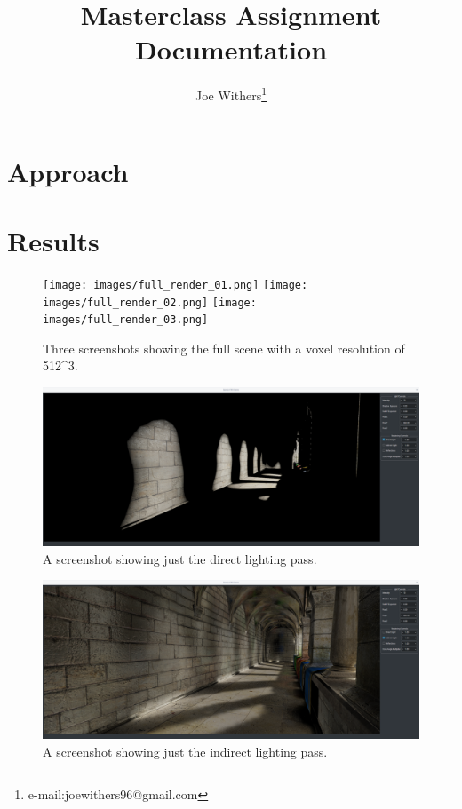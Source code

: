 \documentclass[]{acmsiggraph}
\title{Masterclass Assignment Documentation}
\author{Joe Withers\thanks{e-mail:joewithers96@gmail.com}}
\begin{document}

\maketitle

\section{Approach}

\section{Results}

\begin{figure}[htbp]\centering
 \texttt{[image: images/full\_render\_01.png]}
 \texttt{[image: images/full\_render\_02.png]}
 \texttt{[image: images/full\_render\_03.png]}
 \caption{\label{fig:reference}Three screenshots showing the full scene with a voxel resolution of 512^3.}
\end{figure}

\begin{figure}[htbp]\centering
 \includegraphics[width=1.0\linewidth]{images/direct_only.png}
 \caption{\label{fig:reference}A screenshot showing just the direct lighting pass.}
\end{figure}

\begin{figure}[htbp]\centering
 \includegraphics[width=1.0\linewidth]{images/indirect_only.png}
 \caption{\label{fig:reference}A screenshot showing just the indirect lighting pass.}
\end{figure}
\end{document}
